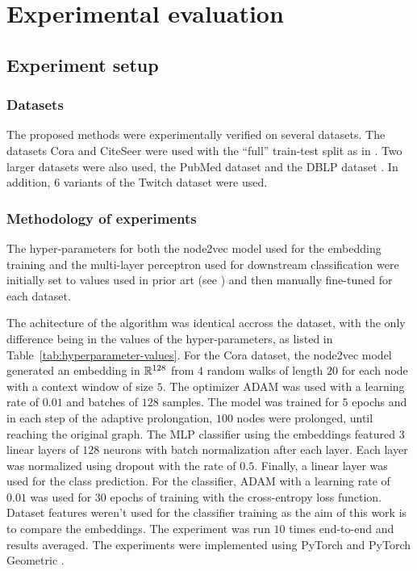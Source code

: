 \section{Experimental evaluation}\label{sec:experimental-evaluation}

\subsection{Experiment setup}

\subsubsection{Datasets}

The proposed methods were experimentally verified on several datasets. The datasets Cora and CiteSeer \cite{yang_revisiting_2016} were used with the \enquote{full} train-test split as in \cite{chen_fastgcn_2018}. Two larger datasets were also used, the PubMed dataset \cite{yang_revisiting_2016} and the DBLP dataset \cite{bojchevski_deep_2018}. In addition, 6 variants of the Twitch dataset \cite{rozemberczki_multi-scale_2021} were used.

\subsubsection{Methodology of experiments}

The hyper-parameters for both the node2vec model used for the embedding training and the multi-layer perceptron used for downstream classification were initially set to values used in prior art (see \cite{hu_open_2021,fey_fast_2019}) and then manually fine-tuned for each dataset.

The achitecture of the algorithm was identical accross the dataset, with the only difference being in the values of the hyper-parameters, as listed in Table~\ref{tab:hyperparameter-values}. For the Cora dataset, the node2vec model generated an embedding in \( \mathbb{R}^{128} \) from \( 4 \) random walks of length \( 20 \) for each node with a context window of size \( 5 \). The optimizer ADAM \cite{kingma_adam:_2017} was used with a learning rate of \( 0.01 \) and batches of \( 128 \) samples. The model was trained for \( 5 \) epochs and in each step of the adaptive prolongation, \( 100 \) nodes were prolonged, until reaching the original graph. The MLP classifier using the embeddings featured \( 3 \) linear layers of \( 128 \) neurons with batch normalization after each layer. Each layer was normalized using dropout \cite{srivastava_dropout_2014} with the rate of \( 0.5 \). Finally, a linear layer was used for the class prediction. For the classifier, ADAM with a learning rate of \( 0.01 \) was used for \( 30 \) epochs of training with the cross-entropy loss function. Dataset features weren't used for the classifier training as the aim of this work is to compare the embeddings. The experiment was run \( 10 \) times end-to-end and results averaged. The experiments were implemented using PyTorch \cite{paszke_pytorch_2019} and PyTorch Geometric \cite{fey_fast_2019}.

